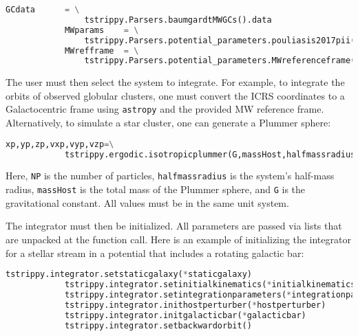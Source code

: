 \documentclass{article}
\begin{document}
        \small
        \begin{lstlisting}[language=python]
            GCdata      = \
                tstrippy.Parsers.baumgardtMWGCs().data
            MWparams    = \
                tstrippy.Parsers.potential_parameters.pouliasis2017pii()
            MWrefframe  = \
                tstrippy.Parsers.potential_parameters.MWreferenceframe()
        \end{lstlisting}
        \normalsize
        The user must then select the system to integrate. For example, to integrate the orbits of observed globular clusters, one must convert the ICRS coordinates to a Galactocentric frame using \texttt{astropy} and the provided MW reference frame. Alternatively, to simulate a star cluster, one can generate a Plummer sphere:
        \small
        \begin{lstlisting}[language=python]
            xp,yp,zp,vxp,vyp,vzp=\
            tstrippy.ergodic.isotropicplummer(G,massHost,halfmassradius,NP)
        \end{lstlisting}
        Here, \texttt{NP} is the number of particles, \texttt{halfmassradius} is the system's half-mass radius, \texttt{massHost} is the total mass of the Plummer sphere, and \texttt{G} is the gravitational constant. All values must be in the same unit system.

        The integrator must then be initialized. All parameters are passed via lists that are unpacked at the function call. Here is an example of initializing the integrator for a stellar stream in a potential that includes a rotating galactic bar:
        \small
        \begin{lstlisting}[language=python]
            tstrippy.integrator.setstaticgalaxy(*staticgalaxy)
            tstrippy.integrator.setinitialkinematics(*initialkinematics)
            tstrippy.integrator.setintegrationparameters(*integrationparameters)
            tstrippy.integrator.inithostperturber(*hostperturber)
            tstrippy.integrator.initgalacticbar(*galacticbar)
            tstrippy.integrator.setbackwardorbit()
        \end{lstlisting}
        \normalsize
\end{document}
